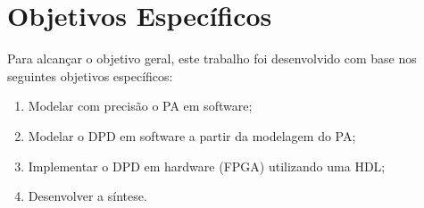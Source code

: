 \section{Objetivos Específicos}

Para alcançar o objetivo geral, este trabalho foi desenvolvido com base nos seguintes objetivos específicos:

\begin{enumerate}
    \item Modelar com precisão o PA em software;
    \item Modelar o DPD em software a partir da modelagem do PA;
    \item Implementar o DPD em hardware (FPGA) utilizando uma HDL;
    \item Desenvolver a síntese.
\end{enumerate}

